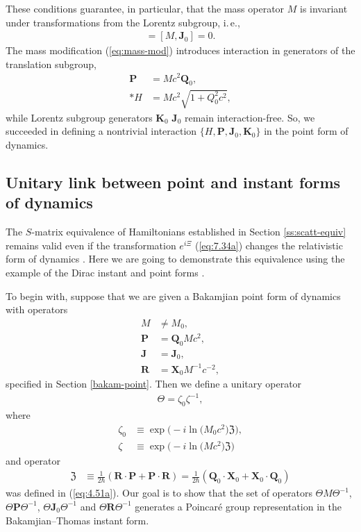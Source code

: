 \documentclass[]{stefan1}
\begin{document}
These conditions guarantee, in particular, that the mass operator
$ M $ is invariant under transformations from the Lorentz subgroup, i.\,e.,
%
\begin{align*}
[M, \boldsymbol{K}_{0}] = [M, \boldsymbol{J}_{0}] = 0.
\end{align*}
The mass modification (\ref{eq:mass-mod}) introduces interaction in
generators of the translation subgroup,
%
\begin{align}
\boldsymbol{P} &= M c^{2} \boldsymbol{Q}_{0},
\nonumber
\\*
H &= M c^{2} \sqrt{1 + Q_{0}^{2}c^{2}},
\label{eq:6.3.5}
\end{align}
while Lorentz subgroup generators $\boldsymbol{K}_{0}$  $
\boldsymbol{J}_{0}$ remain interaction-free. So, we succeeded in
defining a nontrivial interaction $ \{H, \boldsymbol{P},
\boldsymbol{J} _{0}, \boldsymbol{K} _{0} \} $ in the point form of
dynamics.

\subsection{Unitary link between point and instant forms of dynamics}\label{ss:form-equiv-point2}
The $ S $-matrix equivalence of Hamiltonians established in Section
\ref{ss:scatt-equiv} remains valid even if the transformation
$ e ^{i \Xi } $ (\ref{eq:7.34a}) changes the relativistic form of
dynamics \cite{Sokolov_Shatnii,Sokolov_Shatnii2}. Here we are
going to demonstrate this equivalence using the example of the Dirac
instant and point forms \cite{Sokolov_Shatnii}.

To begin with, suppose that we are given a Bakamjian point form of
dynamics with operators
%
\begin{align*}
M &\neq M_{0},
\\
\boldsymbol{P} &= \boldsymbol{Q}_{0} Mc^{2},
\\
\boldsymbol{J} &= \boldsymbol{J}_{0},
\\
\boldsymbol{R} &= \boldsymbol{X}_{0} M^{-1}c^{-2},
\end{align*}
specified in Section \ref{bakam-point}. Then we define a unitary operator
%
\begin{align*}
\Theta = \zeta_{0} \zeta^{-1},
\end{align*}
where
%
\begin{align*}
\zeta_{0} &\equiv \exp \bigl( -i \ln \bigl( M_{0}c^{2}
\bigr) \mathfrak{Z} \bigr) ,
\\
\zeta &\equiv \exp \bigl( -i \ln \bigl( Mc^{2} \bigr) \mathfrak{Z}
\bigr)
\end{align*}
and operator
%
\begin{align*}
\mathfrak{Z} &\equiv \frac{1}{2 \hbar } (\boldsymbol{R} \cdot \boldsymbol{P} +
\boldsymbol{P} \cdot \boldsymbol{R}) = \frac{1}{2
\hbar } (\boldsymbol{Q}_{0}
\cdot \boldsymbol{X}_{0} + \boldsymbol{X} _{0} \cdot
\boldsymbol{Q}_{0})
\end{align*}
was defined in (\ref{eq:4.51a}). Our goal is to show that the set of
operators $\Theta M \Theta^{-1}$, $\Theta \boldsymbol{P} \Theta^{-1}$,
$\Theta \boldsymbol{J}_{0} \Theta^{-1}$ and $\Theta \boldsymbol{R}
\Theta^{-1}$ generates a Poincar\'{e} group representation in the
Bakamjian--Thomas instant form.
\end{document}
